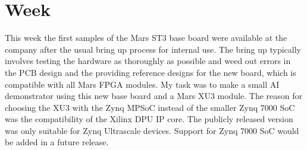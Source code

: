 \chapter{Week}
This week the first samples of the Mars ST3 base board were available at the company after the usual bring up process for internal use. The bring up typically involves testing the hardware as thoroughly as possible and weed out errors in the \ac{PCB} design and the providing reference designs for the new board, which is compatible with all Mars \ac{FPGA} modules. My task was to make a small \ac{AI} demonstrator using this new base board and a Mars XU3 module. The reason for choosing the XU3 with the Zynq \ac{MPSoC} instead of the smaller Zynq 7000 \ac{SoC} was the compatibility of the Xilinx \ac{DPU} \ac{IP} core. The publicly released version was only suitable for Zynq Ultrascale devices. Support for Zynq 7000 \ac{SoC} would be added in a future release.